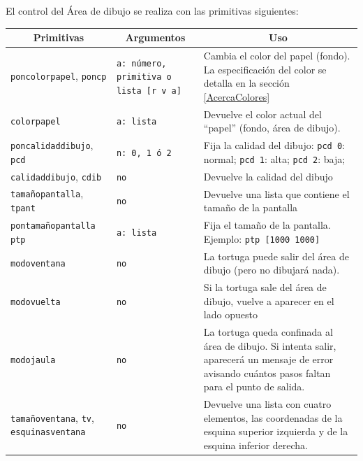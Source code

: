 El control del \'Area de dibujo se realiza con las primitivas siguientes:
\begin{center} \begin{longtable}{|m{3.5cm}|m{3cm}|m{8.5cm}|} \hline  
    \multicolumn{1}{|c|}{\textbf{Primitivas}} &
       \multicolumn{1}{c|}{\textbf{Argumentos}} &
          \multicolumn{1}{c|}{\textbf{Uso}} \\ \endhead \hline 
   \texttt{poncolorpapel}, \index{poncolorpapel@\texttt{poncolorpapel}}
     \texttt{poncp} \index{poncp@\texttt{poncp}} & 
        \texttt{a: n\'umero, primitiva o lista [r v a]} &
           Cambia el color del papel (fondo).
           La especificaci\'on del color se detalla en la secci\'on
            \ref{AcercaColores} \\ \hline 
   \texttt{colorpapel} \index{colorpapel@\texttt{colorpapel}} &
     \texttt{a: lista} &
        Devuelve el color actual del ``papel'' (fondo, \'area
        de dibujo). \\ \hline 
   \texttt{poncalidaddibujo}, \index{poncalidaddibujo@\texttt{poncalidaddibujo}} 
   \texttt{pcd} \index{pcd@\texttt{pcd}}  & \texttt{n: 0, 1 \'o 2} &
        Fija la calidad del dibujo: \texttt{pcd 0}: normal;
         \texttt{pcd 1}: alta; \texttt{pcd 2}: baja; \\ \hline  
   \texttt{calidaddibujo}, \index{calidaddibujo@\texttt{calidaddibujo}}
   \texttt{cdib} \index{cdib@\texttt{cdib}} & \texttt{no} &
        Devuelve la calidad del dibujo \\ \hline 
   \texttt{tama\~nopantalla}, \index{tama\~nopantalla@\texttt{tama\~nopantalla}}
   \texttt{tpant} \index{tpant@\texttt{tpant}} & \texttt{no} &
        Devuelve una lista que contiene el tama\~no de la pantalla \\ \hline 
   \texttt{pontama\~nopantalla}
       \index{pontama\~nopantalla@\texttt{pontama\~nopantalla}}
   \texttt{ptp} \index{@ptp\texttt{ptp}} & \texttt{a: lista} &
        Fija el tama\~no de la pantalla. Ejemplo: \texttt{ptp [1000 1000]} \\ \hline
   \texttt{modoventana} \index{modoventana@\texttt{modoventana}} &
      \texttt{no} &
        La tortuga puede salir del \'area de dibujo (pero no dibujar\'a nada).
           \\ \hline 
   \texttt{modovuelta} \index{modovuelta@\texttt{modovuelta}} & \texttt{no} &
        Si la tortuga sale del \'area de dibujo, vuelve a aparecer en el lado
        opuesto \\ \hline 
   \texttt{modojaula} \index{modojaula@\texttt{modojaula}} & \texttt{no} &
        La tortuga queda confinada al \'area de dibujo. Si intenta salir,
        aparecer\'a un mensaje de error avisando cu\'antos pasos faltan
        para el punto de salida. \\ \hline 
   \texttt{tama\~noventana}, \index{tama\~noventana@\texttt{tama\~noventana}} 
     \texttt{tv}, \index{tv@\texttt{tv}}
   \texttt{esquinasventana} \index{esquinasventana@\texttt{esquinasventana}} &
      \texttt{no} &
        Devuelve una lista con cuatro elementos, las coordenadas de la esquina
        superior izquierda y de la esquina inferior derecha.


\end{longtable}
\end{center}
